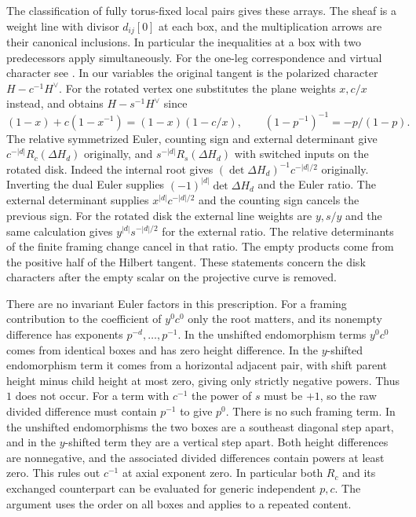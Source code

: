 The classification of fully torus-fixed local pairs gives these arrays. The sheaf is a weight line with divisor $d_{ij}[0]$ at each box, and the multiplication arrows are their canonical inclusions. In particular the inequalities at a box with two predecessors apply simultaneously. For the one-leg correspondence and virtual character see \cite[Theorem~6.1 and \S6.2]{MR}. In our variables the original tangent is the polarized character $H-c^{-1}H^\vee$. For the rotated vertex one substitutes the plane weights $x,c/x$ instead, and obtains $H-s^{-1}H^\vee$ since
\[
 (1-x)+c(1-x^{-1})=(1-x)(1-c/x),\qquad
 (1-p^{-1})^{-1}=-p/(1-p).
\]
The relative symmetrized Euler, counting sign and external determinant give $c^{-|d|}R_c(\Delta H_d)$ originally, and $s^{-|d|}R_s(\Delta H_d)$ with switched inputs on the rotated disk. Indeed the internal root gives $(\det\Delta H_d)^{-1}c^{-|d|/2}$ originally. Inverting the dual Euler supplies $(-1)^{|d|}\det\Delta H_d$ and the Euler ratio. The external determinant supplies $x^{|d|}c^{-|d|/2}$ and the counting sign cancels the previous sign. For the rotated disk the external line weights are $y,s/y$ and the same calculation gives $y^{|d|} s^{-|d|/2}$ for the external ratio. The relative determinants of the finite framing change cancel in that ratio. The empty products come from the positive half of the Hilbert tangent. These statements concern the disk characters after the empty scalar on the projective curve is removed.

There are no invariant Euler factors in this prescription. For a framing contribution to the coefficient of $y^0c^0$ only the root matters, and its nonempty difference has exponents $p^{-d},\ldots,p^{-1}$. In the unshifted endomorphism terms $y^0c^0$ comes from identical boxes and has zero height difference. In the $y$-shifted endomorphism term it comes from a horizontal adjacent pair, with shift parent height minus child height at most zero, giving only strictly negative powers. Thus $1$ does not occur. For a term with $c^{-1}$ the power of $s$ must be $+1$, so the raw divided difference must contain $p^{-1}$ to give $p^0$. There is no such framing term. In the unshifted endomorphisms the two boxes are a southeast diagonal step apart, and in the $y$-shifted term they are a vertical step apart. Both height differences are nonnegative, and the associated divided differences contain powers at least zero. This rules out $c^{-1}$ at axial exponent zero. In particular both $R_c$ and its exchanged counterpart can be evaluated for generic independent $p,c$. The argument uses the order on all boxes and applies to a repeated content.

